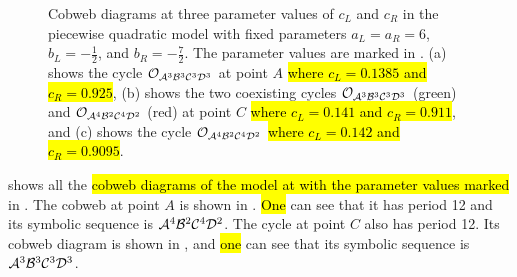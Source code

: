 \begin{figure}
	\centering
	\caption[Cobweb diagrams of the skewed piecewise quadratic model]{
		Cobweb diagrams at three parameter values of $c_L$ and $c_R$ in the piecewise quadratic model with fixed parameters $a_L = a_R = 6$, $b_L = -\frac{1}{2}$, and $b_R = -\frac{7}{2}$.
		The parameter values are marked in .
		(a) shows the cycle $\mathcal{O}_{\mathcal{A}^3\mathcal{B}^3\mathcal{C}^3\mathcal{D}^3}$ at point $A$ \hl{where $c_L = 0.1385$ and $c_R = 0.925$},
		(b) shows the two coexisting cycles $\mathcal{O}_{\mathcal{A}^3\mathcal{B}^3\mathcal{C}^3\mathcal{D}^3}$ (green) and $\mathcal{O}_{\mathcal{A}^4\mathcal{B}^2\mathcal{C}^4\mathcal{D}^2}$ (red) at point $C$ \hl{where $c_L = 0.141$ and $c_R = 0.911$},
		and (c) shows the cycle $\mathcal{O}_{\mathcal{A}^4\mathcal{B}^2\mathcal{C}^4\mathcal{D}^2}$ \hl{where $c_L = 0.142$ and $c_R = 0.9095$}.
	}
	\label{fig:setup.quad.skew.cobwebs}
\end{figure}

 shows all the \hl{cobweb diagrams of the model at with the parameter values marked} in .
The cobweb at point $A$ is shown in .
\hl{One} can see that it has period 12 and its symbolic sequence is $\mathcal{A}^4\mathcal{B}^2\mathcal{C}^4\mathcal{D}^2$.
The cycle at point $C$ also has period 12.
Its cobweb diagram is shown in , and \hl{one} can see that its symbolic sequence is $\mathcal{A}^3\mathcal{B}^3\mathcal{C}^3\mathcal{D}^3$.

